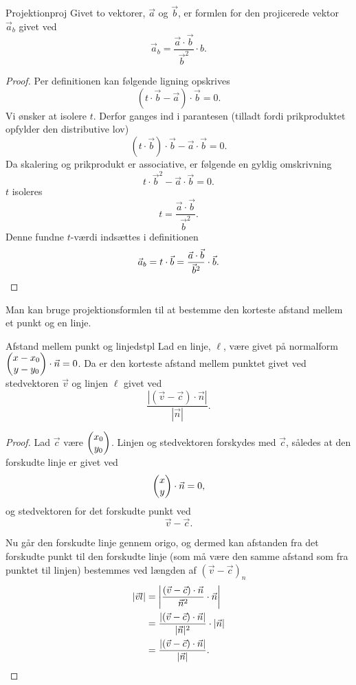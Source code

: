 \documentclass{article}
\begin{document}
\begin{theorem}{Projektion}{proj}
    Givet to vektorer, $\vec{a}$ og $\vec{b}$, er formlen for den projicerede
    vektor $\vec{a}_b$ givet ved 
    \[
        \vec{a}_b = \frac{\vec{a} \cdot \vec{b}}{\vec{b}^2} \cdot b.
    \] 
\end{theorem}

\begin{proof}
Per definitionen kan følgende ligning opskrives
\[
    (t \cdot \vec{b} - \vec{a}) \cdot \vec{b} = 0.
\] 
Vi ønsker at isolere $t$. Derfor ganges ind i parantesen (tilladt fordi
prikproduktet opfylder den distributive lov)
\[
    (t \cdot \vec{b}) \cdot \vec{b} - \vec{a} \cdot \vec{b} = 0.
\] 
Da skalering og prikprodukt er associative, er følgende en gyldig omskrivning
\[
    t \cdot \vec{b}^2 - \vec{a} \cdot \vec{b} = 0.
\] 
$t$ isoleres
\[
    t = \frac{\vec{a} \cdot \vec{b}}{\vec{b}^2}.
\] 
Denne fundne $t$-værdi indsættes i definitionen
\[
    \vec{a}_b = t \cdot \vec{b} = \frac{\vec{a} \cdot \vec{b}}{\vec{b}^2} \cdot \vec{b}.\qedhere
\] 
\end{proof}

Man kan bruge projektionsformlen til at bestemme den korteste afstand mellem et
punkt og en linje.

\smallskip

\begin{theorem}{Afstand mellem punkt og linje}{dstpl}
    Lad en linje, $\ell$, være givet på normalform $ \begin{pmatrix} x - x_0\\ y - y_0 \end{pmatrix} 
    \cdot \vec{n} = 0$. Da er den korteste afstand mellem punktet givet ved
    stedvektoren $\vec{v}$ og linjen $\ell$ givet ved
    \[
        \frac{|(\vec{v} - \vec{c}) \cdot \vec{n}|}{|\vec{n}|}.
    \] 
\end{theorem}

\begin{proof}
    Lad $\vec{c}$ være $ \begin{pmatrix} x_0\\ y_0 \end{pmatrix} $. Linjen og stedvektoren forskydes
    med $\vec{c}$, således at den forskudte linje er givet ved
    \[
         \begin{pmatrix} x\\ y \end{pmatrix}  \cdot \vec{n} = 0,
    \] 
    og stedvektoren for det forskudte punkt ved
    \[
        \vec{v} - \vec{c}.
    \] 

    Nu går den forskudte linje gennem origo, og dermed kan afstanden fra det
    forskudte punkt til den forskudte linje (som må være den samme afstand som
    fra punktet til linjen) bestemmes ved længden af $(\vec{v} -
    \vec{c})_{n}$
    \begin{align*}
        |\vec{v}l| &= \left| \frac{(\vec{v} - \vec{c}) \cdot \vec{n}}{\vec{n}^2} \cdot \vec{n} \right|\\
                   &= \frac{|(\vec{v} - \vec{c}) \cdot \vec{n}|}{|\vec{n}|^2} \cdot |\vec{n}|\\
                   &= \frac{|(\vec{v} - \vec{c}) \cdot \vec{n}|}{|\vec{n}|}.\qedhere
    \end{align*}
\end{proof}
\end{document}
